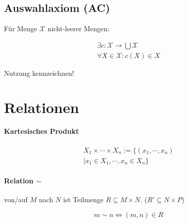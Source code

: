 \subsection{Auswahlaxiom (AC)}

Für Menge $\mathcal{X}$ nicht-leerer Mengen:

\begin{gather*}
  \exists c: \mathcal{X} \rightarrow \bigcup \mathcal{X} \\
  \forall X \in \mathcal{X}: c(X) \in X
\end{gather*}

Nutzung kennzeichnen!

\section{Relationen}

\paragraph{Kartesisches Produkt}

\begin{gather*}
  X_1 \times \cdots \times X_n := \{ (x_1, \cdots, x_n) \\
  | x_1 \in X_1, \cdots, x_n \in X_n \}
\end{gather*}

\paragraph{Relation $\boldsymbol{\sim}$} von/auf $M$ nach $N$ ist Teilmenge $R \subseteq M \times N$. ($R' \subseteq N \times P$)

$$m \boldsymbol{\sim} n \Leftrightarrow (m, n) \in R$$

